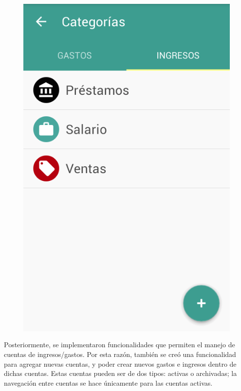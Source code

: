 \begin{figure}[ht]
\begin{minipage}{.5\textwidth}
\centering
  \includegraphics[scale=0.4,type=png,ext=.png,read=.png]{imagenes/income_categories}
  \captionsetup{justification=centering}
  \label{fig:interfazListarIncomeCategories}
\end{minipage}
\end{figure}

Posteriormente, se implementaron funcionalidades que permiten el manejo de cuentas de ingresos/gastos. Por esta razón, también se creó una funcionalidad para agregar nuevas cuentas, y poder crear nuevos gastos e ingresos dentro de dichas cuentas. Estas cuentas pueden ser de dos tipos: activas o archivadas; la navegación entre cuentas se hace únicamente para las cuentas activas. 


